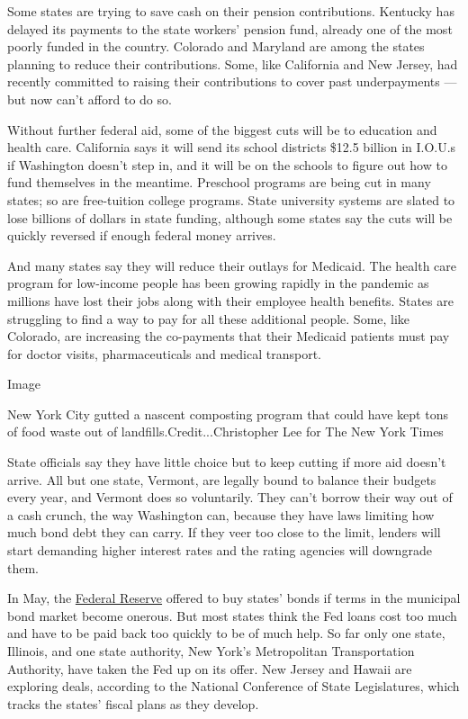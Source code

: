 Some states are trying to save cash on their pension contributions.
Kentucky has delayed its payments to the state workers' pension fund,
already one of the most poorly funded in the country. Colorado and
Maryland are among the states planning to reduce their contributions.
Some, like California and New Jersey, had recently committed to raising
their contributions to cover past underpayments --- but now can't afford
to do so.

Without further federal aid, some of the biggest cuts will be to
education and health care. California says it will send its school
districts \$12.5 billion in I.O.U.s if Washington doesn't step in, and
it will be on the schools to figure out how to fund themselves in the
meantime. Preschool programs are being cut in many states; so are
free-tuition college programs. State university systems are slated to
lose billions of dollars in state funding, although some states say the
cuts will be quickly reversed if enough federal money arrives.

And many states say they will reduce their outlays for Medicaid. The
health care program for low-income people has been growing rapidly in
the pandemic as millions have lost their jobs along with their employee
health benefits. States are struggling to find a way to pay for all
these additional people. Some, like Colorado, are increasing the
co-payments that their Medicaid patients must pay for doctor visits,
pharmaceuticals and medical transport.

Image

New York City gutted a nascent composting program that could have kept
tons of food waste out of landfills.Credit...Christopher Lee for The New
York Times

State officials say they have little choice but to keep cutting if more
aid doesn't arrive. All but one state, Vermont, are legally bound to
balance their budgets every year, and Vermont does so voluntarily. They
can't borrow their way out of a cash crunch, the way Washington can,
because they have laws limiting how much bond debt they can carry. If
they veer too close to the limit, lenders will start demanding higher
interest rates and the rating agencies will downgrade them.

In May, the
\href{https://www.nytimes3xbfgragh.onion/2020/06/03/business/economy/fed-expands-municipal-bond-program.html}{Federal
Reserve} offered to buy states' bonds if terms in the municipal bond
market become onerous. But most states think the Fed loans cost too much
and have to be paid back too quickly to be of much help. So far only one
state, Illinois, and one state authority, New York's Metropolitan
Transportation Authority, have taken the Fed up on its offer. New Jersey
and Hawaii are exploring deals, according to the National Conference of
State Legislatures, which tracks the states' fiscal plans as they
develop.

